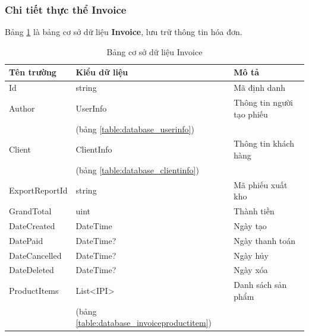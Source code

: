 \documentclass[../DoAn.tex]{subfiles}
\begin{document}
\subsubsection{Chi tiết thực thể Invoice}
\label{subsubsection:detaildesign-database-invoice}
Bảng \ref{table:database_invoice} là bảng cơ sở dữ liệu \textbf{Invoice}, lưu trữ thông tin hóa đơn.
\begin{table}[H]
    \centering
    \begin{tabularx}{\textwidth}{|p{4cm}|p{3cm}|X|}
        \hline
        \textbf{Tên trường} & \textbf{Kiểu dữ liệu}                          & \textbf{Mô tả}            \\ \hline
        Id                  & string                                         & Mã định danh              \\ \hline
        Author              & UserInfo                                       & Thông tin người tạo phiếu \\
                            & (bảng \ref{table:database_userinfo})           &                           \\ \hline
        Client              & ClientInfo                                     & Thông tin khách hàng      \\
                            & (bảng \ref{table:database_clientinfo})         &                           \\ \hline
        ExportReportId      & string                                         & Mã phiếu xuất kho         \\ \hline
        GrandTotal          & uint                                           & Thành tiền                \\ \hline
        DateCreated         & DateTime                                       & Ngày tạo                  \\ \hline
        DatePaid            & DateTime?                                      & Ngày thanh toán           \\ \hline
        DateCancelled       & DateTime?                                      & Ngày hủy                  \\ \hline
        DateDeleted         & DateTime?                                      & Ngày xóa                  \\ \hline
        ProductItems        & List<IPI>                                      & Danh sách sản phẩm        \\
                            & (bảng \ref{table:database_invoiceproductitem}) &                           \\ \hline
    \end{tabularx}
    \caption{Bảng cơ sở dữ liệu Invoice}
    \label{table:database_invoice}
\end{table}
\end{document}
